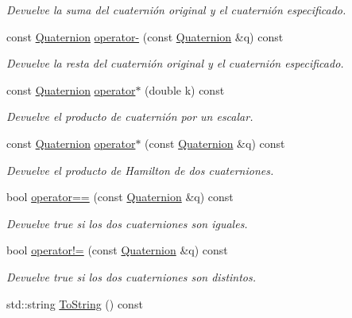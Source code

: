 \begin{DoxyCompactItemize}
\begin{DoxyCompactList}\small\item\em \-Devuelve la suma del cuaternión original y el cuaternión especificado. \end{DoxyCompactList}\item 
const \hyperlink{classdfv_1_1Quaternion}{\-Quaternion} \hyperlink{classdfv_1_1Quaternion_a2cdb5023ad4b96c456b47f4fb9baa827}{operator-\/} (const \hyperlink{classdfv_1_1Quaternion}{\-Quaternion} \&q) const 
\begin{DoxyCompactList}\small\item\em \-Devuelve la resta del cuaternión original y el cuaternión especificado. \end{DoxyCompactList}\item 
const \hyperlink{classdfv_1_1Quaternion}{\-Quaternion} \hyperlink{classdfv_1_1Quaternion_a1909ce2ad8ea1a853e7711887f7101fc}{operator$\ast$} (double k) const 
\begin{DoxyCompactList}\small\item\em \-Devuelve el producto de cuaternión por un escalar. \end{DoxyCompactList}\item 
const \hyperlink{classdfv_1_1Quaternion}{\-Quaternion} \hyperlink{classdfv_1_1Quaternion_ae6d1e1b30d0832071848d382e5c72594}{operator$\ast$} (const \hyperlink{classdfv_1_1Quaternion}{\-Quaternion} \&q) const 
\begin{DoxyCompactList}\small\item\em \-Devuelve el producto de \-Hamilton de dos cuaterniones. \end{DoxyCompactList}\item 
bool \hyperlink{classdfv_1_1Quaternion_a38e1bcbd6778b5cf39094b96dd5f172b}{operator==} (const \hyperlink{classdfv_1_1Quaternion}{\-Quaternion} \&q) const 
\begin{DoxyCompactList}\small\item\em \-Devuelve true si los dos cuaterniones son iguales. \end{DoxyCompactList}\item 
bool \hyperlink{classdfv_1_1Quaternion_a2bcf3a1d78729e52f00fe2d32998801c}{operator!=} (const \hyperlink{classdfv_1_1Quaternion}{\-Quaternion} \&q) const 
\begin{DoxyCompactList}\small\item\em \-Devuelve true si los dos cuaterniones son distintos. \end{DoxyCompactList}\item 
\hypertarget{classdfv_1_1Quaternion_a2129ed9a5eab9fdfdc16658e98077b56}{std\-::string \hyperlink{classdfv_1_1Quaternion_a2129ed9a5eab9fdfdc16658e98077b56}{\-To\-String} () const }\label{classdfv_1_1Quaternion_a2129ed9a5eab9fdfdc16658e98077b56}


\end{DoxyCompactItemize}
